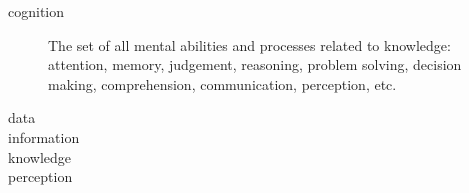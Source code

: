 \begin{description}
\item[cognition] The set of all mental abilities and processes related to knowledge: attention, memory, judgement, reasoning, problem solving, decision making, comprehension, communication, perception, etc.
\item[data]
\item[information]
\item[knowledge]
\item[perception]
\end{description}